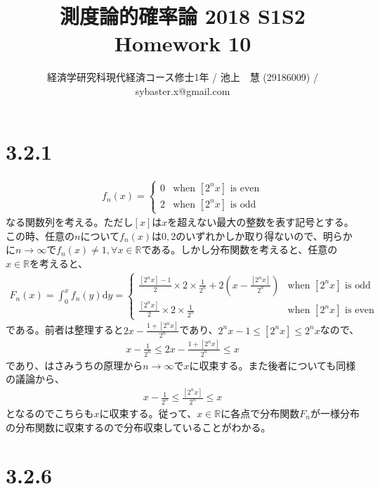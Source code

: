 \documentclass{article}
\begin{document}
\title{測度論的確率論 2018 S1S2 \\ 
Homework 10}
\author{経済学研究科現代経済コース修士1年 / 池上　慧 (29186009) / sybaster.x@gmail.com}
\maketitle

\section{3.2.1}
\begin{align*}
	f_n(x) = \begin{cases} 0 & \text{when $\left[ 2^n x \right]$ is even}\\[8pt]
	2 & \text{when $\left[ 2^n x \right]$ is odd}
	\end{cases}
\end{align*}
なる関数列を考える。ただし$\left[ x \right]$は$x$を超えない最大の整数を表す記号とする。この時、任意の$n$について$f_n(x)$は$0,2$のいずれかしか取り得ないので、明らかに$n \to \infty$で$f_n(x) \neq 1 ,\forall x \in \mathbb{R}$である。しかし分布関数を考えると、任意の$x \in \mathbb{R}$を考えると、
\begin{align*}
	F_n(x) = \int_0^x f_n(y) \mathrm{d}y = \begin{cases} \frac{\left[ 2^n x \right] - 1}{2} \times 2 \times \frac{1}{2^n} + 2\left( x - \frac{\left[ 2^n x \right]}{2^n} \right) & \text{when $\left[ 2^n x \right]$ is odd} \\[8pt]
	\frac{\left[ 2^n x \right] }{2} \times 2 \times \frac{1}{2^n}  & \text{when $\left[ 2^n x \right]$ is even}
	\end{cases}
\end{align*}
である。前者は整理すると$2x - \frac{1 + \left[ 2^n x \right]}{2^n}$であり、$2^n x - 1 \leq \left[ 2^n x \right] \leq 2^n x$なので、
\begin{align*}
	x - \frac{1}{2^n}\leq 2x - \frac{1 + \left[ 2^n x \right]}{2^n} \leq x
\end{align*}
であり、はさみうちの原理から$n \to \infty$で$x$に収束する。また後者についても同様の議論から、
\begin{align*}
	x-\frac{1}{2^n} \leq \frac{\left[ 2^n x \right]}{2^n} \leq x
\end{align*}
となるのでこちらも$x$に収束する。従って、$x \in \mathbb{R}$に各点で分布関数$F_n$が一様分布の分布関数に収束するので分布収束していることがわかる。

\section{3.2.6}
\end{document}
